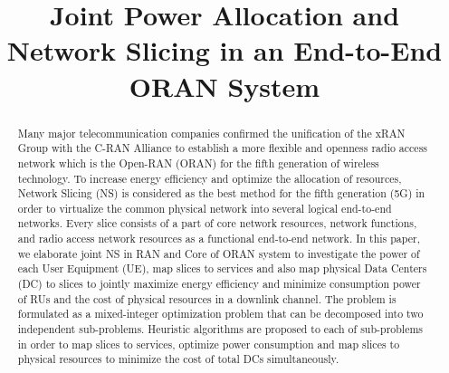 \documentclass[conference]{IEEEtran}
\begin{document}
\title{Joint Power Allocation and Network Slicing in an End-to-End ORAN System \vspace{-.1cm}
}
%
  \author{
  }

\maketitle

\begin{abstract}
Many major telecommunication companies confirmed the unification of the xRAN Group with the C-RAN Alliance to establish a more flexible and openness radio access network which is the Open-RAN
(ORAN) for the fifth generation of wireless technology. To increase energy efficiency and optimize the allocation of resources, Network Slicing (NS) is considered as the best method for the fifth generation (5G) in order to virtualize the common physical network into several logical end-to-end networks. Every slice consists of a part of core network resources, network functions, and radio access network resources as a functional end-to-end network. In this paper, we elaborate joint NS in RAN and Core of ORAN system to investigate the power
of each User Equipment (UE), map slices to services and also map physical Data Centers (DC) to slices to jointly maximize energy efficiency and minimize consumption power of RUs and the cost of  physical resources in a downlink channel. The problem is formulated as a mixed-integer optimization problem that can be decomposed into two independent sub-problems.
Heuristic algorithms are proposed to each of sub-problems in order to map slices to services, optimize power consumption and map slices to physical resources to minimize the cost of total DCs simultaneously.
\end{abstract}
\end{document}
